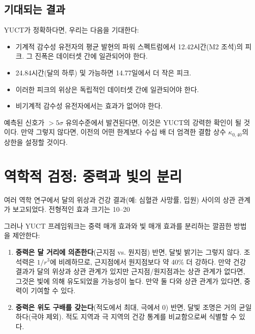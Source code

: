 \documentclass[12pt,a4paper]{article}
\theoremstyle{remark}
\begin{document}
	\subsection{기대되는 결과}
	
	YUCT가 정확하다면, 우리는 다음을 기대한다:
	\begin{itemize}
		\item 기계적 감수성 유전자의 평균 발현의 파워 스펙트럼에서 12.42시간(M2 조석)의 피크. 그 진폭은 데이터셋 간에 일관되어야 한다.
		\item 24.84시간(달의 하루) 및 가능하면 14.77일에서 더 작은 피크.
		\item 이러한 피크의 위상은 독립적인 데이터셋 간에 일관되어야 한다.
		\item 비기계적 감수성 유전자에서는 효과가 없어야 한다.
	\end{itemize}
	
	예측된 신호가 \(> 5\sigma\) 유의수준에서 발견된다면, 이것은 YUCT의 강력한 확인이 될 것이다. 만약 그렇지 않다면, 이전의 어떤 한계보다 수십 배 더 엄격한 결합 상수 \(\kappa_{0,40}\)의 상한을 설정할 것이다.
	
	\section{역학적 검정: 중력과 빛의 분리}
	\label{sec:epidemiology}
	
	여러 역학 연구에서 달의 위상과 건강 결과(예: 심혈관 사망률, 입원) 사이의 상관 관계가 보고되었다. 전형적인 효과 크기는 10–20%
	
	그러나 YUCT 프레임워크는 중력 매개 효과와 빛 매개 효과를 분리하는 깔끔한 방법을 제안한다:
	
	\begin{enumerate}
		\item \textbf{중력은 달 거리에 의존한다}(근지점 vs. 원지점) 반면, 달빛 밝기는 그렇지 않다. 조석력은 \(1/r^3\)에 비례하므로, 근지점에서 원지점보다 약 40\% 더 강하다. 만약 건강 결과가 달의 위상과 상관 관계가 있지만 근지점/원지점과는 상관 관계가 없다면, 그것은 빛에 의해 유도되었을 가능성이 높다. 만약 둘 다와 상관 관계가 있다면, 중력이 기여할 수 있다.
		\item \textbf{중력은 위도 구배를 갖는다}(적도에서 최대, 극에서 0) 반면, 달빛 조명은 거의 균일하다(극야 제외). 적도 지역과 극 지역의 건강 통계를 비교함으로써 식별할 수 있다.
	\end{enumerate}
	
\end{document}
